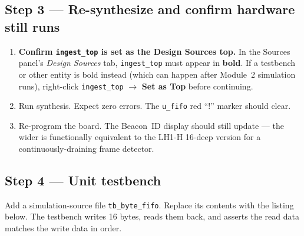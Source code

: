 \documentclass[11pt,letterpaper]{article}
\begin{document}
\subsection{Step 3 --- Re-synthesize and confirm hardware still runs}
\begin{enumerate}[leftmargin=2em]
	\item \textbf{Confirm \texttt{ingest\_top} is set as the Design Sources top.} In the Sources panel's \textit{Design Sources} tab, \texttt{ingest\_top} must appear in \textbf{bold}. If a testbench or other entity is bold instead (which can happen after Module~2 simulation runs), right-click \texttt{ingest\_top} $\to$ \textbf{Set as Top} before continuing.
	\item Run synthesis. Expect zero errors. The \texttt{u\_fifo} red ``!'' marker should clear.
	\item Re-program the board. The Beacon~ID display should still update --- the wider \FIFO{} is functionally equivalent to the LH1-H 16-deep version for a continuously-draining frame detector.
\end{enumerate}


\subsection{Step 4 --- Unit testbench}

Add a simulation-source file \texttt{tb\_byte\_fifo}. Replace its contents with the listing below. The testbench writes 16 bytes, reads them back, and asserts the read data matches the write data in order.
\end{document}
